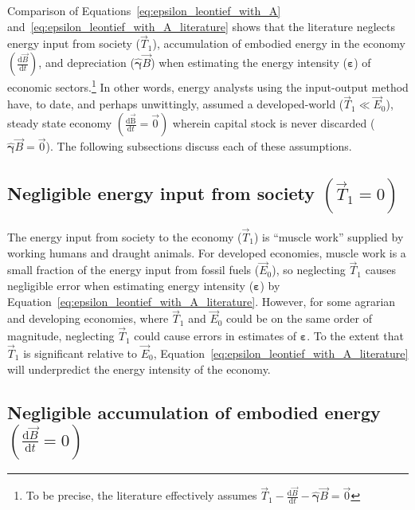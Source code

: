 \noindent{}Comparison of 
Equations~\ref{eq:epsilon_leontief_with_A}
and~\ref{eq:epsilon_leontief_with_A_literature}
shows that the literature neglects
energy input from society ($\vec{T}_{1}$),
accumulation of embodied energy in the economy 
$\left( \frac{\mathrm{d}\vec{B}}{\mathrm{d}t} \right)$,
and depreciation ($\hat{\bm{\gamma}}\vec{B}$)
when estimating the energy intensity ($\bm{\varepsilon}$) 
of economic sectors.\footnote{To be precise, 
the literature effectively assumes
$
	\vec{T}_{1}
	- \frac{\mathrm{d}\vec{B}}{\mathrm{d}t} 
	- \hat{\bm{\gamma}}\vec{B} 
	= \vec{0}
$}
In other words, energy analysts using the input-output method
have, to date, and perhaps unwittingly, assumed 
a developed-world ($\vec{T}_{1} \ll \vec{E}_{0}$), 
steady state economy 
$\left( \frac{\mathrm{d}\mathrm{\vec{B}}}{\mathrm{d}t} = \vec{0} \right)$
wherein capital stock is never discarded ($\hat{\bm{\gamma}}\vec{B} = \vec{0}$).
The following subsections discuss each of these assumptions.

\subsection{Negligible energy input from society $\left( \vec{T}_{1} = 0 \right)$}

The energy input from society to the economy ($\vec{T}_{1}$)
is ``muscle work'' supplied by working humans 
and draught animals.\cite{Ayres:2003ec,Ayres:2010ug,Warr:2012cg} 
For developed economies, muscle work is a small fraction
of the energy input from fossil fuels ($\vec{E}_{0}$),
so neglecting $\vec{T}_{1}$ causes negligible error when
estimating energy intensity ($\bm{\varepsilon}$) by
Equation~\ref{eq:epsilon_leontief_with_A_literature}.
However, for some agrarian and developing economies, 
where $\vec{T}_{1}$ and $\vec{E}_{0}$ 
could be on the same order of magnitude,
neglecting $\vec{T}_{1}$ could cause errors
in estimates of $\bm{\varepsilon}$.
To the extent that $\vec{T}_{1}$ 
is significant relative to $\vec{E}_{0}$,
Equation~\ref{eq:epsilon_leontief_with_A_literature}
will underpredict the energy intensity of the economy.


\subsection{Negligible accumulation of embodied energy
$\left( \frac{\mathrm{d}\vec{B}}{\mathrm{d}t} = 0 \right)$}

